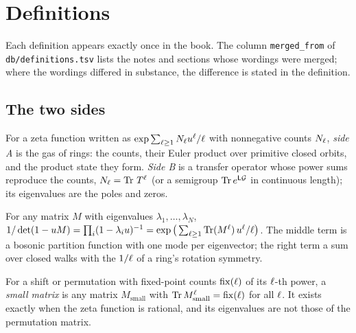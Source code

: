 
\section{Definitions}
\label{sec:definitions}

Each definition appears exactly once in the book. The column
\texttt{merged\_from} of \texttt{db/definitions.tsv} lists the notes and
sections whose wordings were merged; where the wordings differed in
substance, the difference is stated in the definition.

\subsection{The two sides}

\begin{definition}
\label{def:side-a-side-b}
For a zeta function written as $\exp\sum_{\ell\ge1}N_{\ell}u^{\ell}/\ell$
with nonnegative counts $N_{\ell}$, \emph{side A} is the gas of rings:
the counts, their Euler product over primitive closed orbits, and the
product state they form. \emph{Side B} is a transfer operator whose power
sums reproduce the counts, $N_{\ell} = \operatorname{Tr}\,T^{\ell}$ (or a
semigroup $\operatorname{Tr} e^{\mathsf L\mathcal G}$ in continuous length); its eigenvalues
are the poles and zeros.
\end{definition}

\begin{definition}
\label{def:one-identity}
For any matrix $M$ with eigenvalues $\lambda_1,\dots,\lambda_N$,
$1/\det(1-u M) = \prod_i(1-\lambda_iu)^{-1} =
\exp\big(\sum_{\ell\ge1}\operatorname{Tr}(M^{\ell})\,u^{\ell}/\ell\big)$. The middle term is a
bosonic partition function with one mode per eigenvector; the right term a
sum over closed walks with the $1/\ell$ of a ring's rotation symmetry.
\end{definition}

\begin{definition}
\label{def:small-matrix}
For a shift or permutation with fixed-point counts
$\operatorname{fix}(\ell)$ of its $\ell$-th power, a \emph{small matrix} is any matrix
$M_{\mathrm{small}}$ with $\operatorname{Tr} M_{\mathrm{small}}^{\ell} =
\operatorname{fix}(\ell)$ for all $\ell$. It exists exactly when the
zeta function is rational, and its eigenvalues are not those of the
permutation matrix.
\end{definition}

